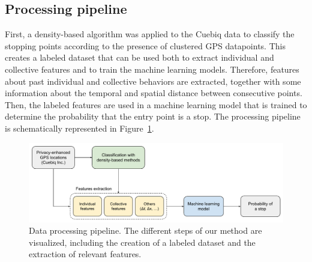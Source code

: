 \documentclass{article}
\begin{document}
\subsection{Processing pipeline}
First, a density-based algorithm was applied to the Cuebiq data to classify the stopping points according to the presence of clustered GPS datapoints. This creates a labeled dataset that can be used both to extract individual and collective features and to train the machine learning models. Therefore, features about past individual and collective behaviors are extracted, together with some information about the temporal and spatial distance between consecutive points. Then, the labeled features are used in a machine learning model that is trained to determine the probability that the entry point is a stop. The processing pipeline is schematically represented in Figure~\ref{fig:pipeline}.
\begin{figure}[ht]
    \includegraphics[width=\textwidth]{./Images/pipeline.pdf}
	\centering
	\caption{Data processing pipeline. The different steps of our method are visualized, including the creation of a labeled dataset and the extraction of relevant features.}
	\label{fig:pipeline}
\end{figure}
\end{document}
